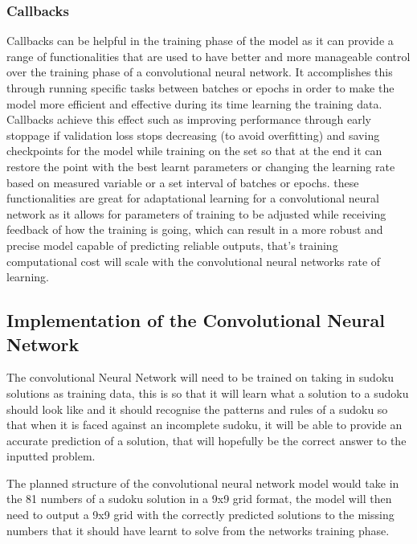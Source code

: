 \documentclass[]{final_report}
\begin{document}
\subsubsection{Callbacks}

Callbacks can be helpful in the training phase of the model as it can provide a range of functionalities that are used to have better and more manageable control over the training phase of a convolutional neural network. It accomplishes this through running specific tasks between batches or epochs in order to make the model more efficient and effective during its time learning the training data. Callbacks achieve this effect such as improving performance through early stoppage if validation loss stops decreasing (to avoid overfitting) and saving checkpoints for the model while training on the set so that at the end it can restore the point with the best learnt parameters or changing the learning rate based on measured variable or a set interval of batches or epochs. these functionalities are great for adaptational learning for a convolutional neural network as it allows for parameters of training to be adjusted while receiving feedback of how the training is going, which can result in a more robust and precise model capable of predicting reliable outputs, that's training computational cost will scale with the convolutional neural networks rate of learning.\cite{KerasCallbacks2025}

\subsection{Implementation of the Convolutional Neural Network}

The convolutional Neural Network will need to be trained on taking in sudoku solutions as training data, this is so that it will learn what a solution to a sudoku should look like and it should recognise the patterns and rules of a sudoku so that when it is faced against an incomplete sudoku, it will be able to provide an accurate prediction of a solution, that will hopefully be the correct answer to the inputted problem. 

The planned structure of the convolutional neural network model would take in the 81 numbers of a sudoku solution in a 9x9 grid format, the model will then need to output a 9x9 grid with the correctly predicted solutions to the missing numbers that it should have learnt to solve from the networks training phase. 
\end{document}
